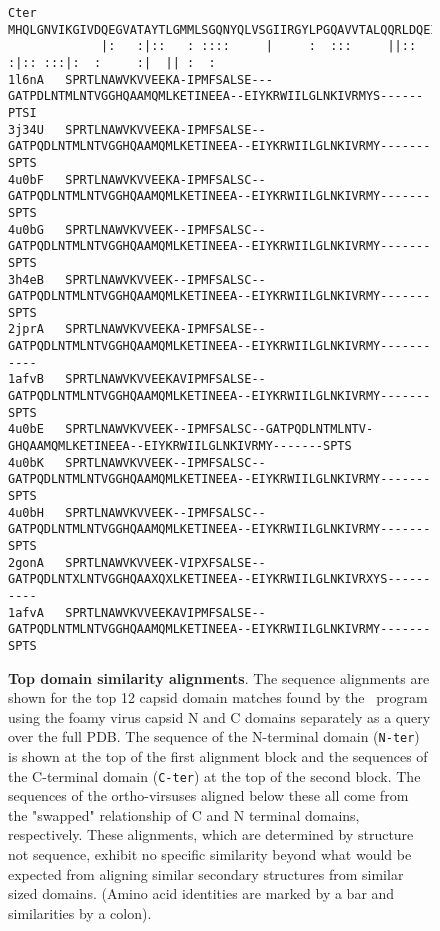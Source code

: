 \begin{figure}
\begin{singlespace}
\begin{tiny}
\begin{Verbatim}[frame=single]
Cter    MHQLGNVIKGIVDQEGVATAYTLGMMLSGQNYQLVSGIIRGYLPGQAVVTALQQRLDQEIDNQTRAETFIQHLNAVYEILGLNARGQSIRL
             |:   :|::   : ::::     |     :  :::     ||:: :|:: :::|:  :     :|  || :  :    
1l6nA   SPRTLNAWVKVVEEKA-IPMFSALSE---GATPDLNTMLNTVGGHQAAMQMLKETINEEA--EIYKRWIILGLNKIVRMYS------PTSI
3j34U   SPRTLNAWVKVVEEKA-IPMFSALSE--GATPQDLNTMLNTVGGHQAAMQMLKETINEEA--EIYKRWIILGLNKIVRMY-------SPTS
4u0bF   SPRTLNAWVKVVEEKA-IPMFSALSC--GATPQDLNTMLNTVGGHQAAMQMLKETINEEA--EIYKRWIILGLNKIVRMY-------SPTS
4u0bG   SPRTLNAWVKVVEEK--IPMFSALSC--GATPQDLNTMLNTVGGHQAAMQMLKETINEEA--EIYKRWIILGLNKIVRMY-------SPTS
3h4eB   SPRTLNAWVKVVEEK--IPMFSALSC--GATPQDLNTMLNTVGGHQAAMQMLKETINEEA--EIYKRWIILGLNKIVRMY-------SPTS
2jprA   SPRTLNAWVKVVEEKA-IPMFSALSE--GATPQDLNTMLNTVGGHQAAMQMLKETINEEA--EIYKRWIILGLNKIVRMY-----------
1afvB   SPRTLNAWVKVVEEKAVIPMFSALSE--GATPQDLNTMLNTVGGHQAAMQMLKETINEEA--EIYKRWIILGLNKIVRMY-------SPTS
4u0bE   SPRTLNAWVKVVEEK--IPMFSALSC--GATPQDLNTMLNTV-GHQAAMQMLKETINEEA--EIYKRWIILGLNKIVRMY-------SPTS
4u0bK   SPRTLNAWVKVVEEK--IPMFSALSC--GATPQDLNTMLNTVGGHQAAMQMLKETINEEA--EIYKRWIILGLNKIVRMY-------SPTS
4u0bH   SPRTLNAWVKVVEEK--IPMFSALSC--GATPQDLNTMLNTVGGHQAAMQMLKETINEEA--EIYKRWIILGLNKIVRMY-------SPTS
2gonA   SPRTLNAWVKVVEEK-VIPXFSALSE--GATPQDLNTXLNTVGGHQAAXQXLKETINEEA--EIYKRWIILGLNKIVRXYS----------
1afvA   SPRTLNAWVKVVEEKAVIPMFSALSE--GATPQDLNTMLNTVGGHQAAMQMLKETINEEA--EIYKRWIILGLNKIVRMY-------SPTS
\end{Verbatim}
\end{tiny}
\end{singlespace}
\begin{footnotesize}
\caption{
\label{Fig:swap}
{\bf Top domain similarity alignments}.
The sequence alignments are shown for the top 12 capsid domain matches found by the \DALI\ program 
using the foamy virus capsid N and C domains separately as a query over the full PDB.
The sequence of the N-terminal domain ({\tt N-ter}) is shown at the top of the first alignment block and the
sequences of the C-terminal domain ({\tt C-ter}) at the top of the second block.   The sequences of the
ortho-virsuses aligned below these all come from the "swapped" relationship of C and N terminal domains,
respectively.   These alignments, which are determined by structure not sequence, exhibit no
specific similarity beyond what would be expected from aligning similar secondary structures from
similar sized domains. (Amino acid identities are marked by a bar and similarities by a colon).
}
\end{footnotesize}
\end{figure}

